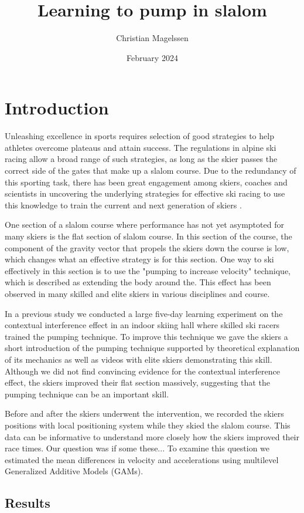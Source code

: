 \documentclass{article}
\title{Learning to pump in slalom}
\author{Christian Magelssen}
\date{February 2024}
\begin{document}
\section{Introduction}
Unleashing excellence in sports requires selection of good strategies to help athletes overcome plateaus and attain success. The regulations in alpine ski racing allow a broad range of such strategies, as long as the skier passes the correct side of the gates that make up a slalom course. Due to the redundancy of this sporting task, there has been great engagement among skiers, coaches and scientists in uncovering the underlying strategies for effective ski racing to use this knowledge to train the current and next generation of skiers \cite{joubertHowSkiNew1967, joubertSkiArtTechnique1978, mullerAnalysisBiomechanicalCharacteristics1994, lemasterSkierEdge1999, lemasterUltimateSkiing2010}.

One section of a slalom course where performance has not yet asymptoted for many skiers is the flat section of slalom course. In this section of the course, the component of the gravity vector that propels the skiers down the course is low, which changes what an effective strategy is for this section. One way to ski effectively in this section is to use the "pumping to increase velocity" technique, which is described as extending the body around the. This effect has been observed in many skilled and elite skiers in various disciplines and course.

In a previous study we conducted a large five-day learning experiment on the contextual interference effect in an indoor skiing hall where skilled ski racers trained the pumping technique. To improve this technique we gave the skiers a short introduction of the pumping technique supported by theoretical explanation of its mechanics as well as videos with elite skiers demonstrating this skill. Although we did not find convincing evidence for the contextual interference effect, the skiers improved their flat section massively, suggesting that the pumping technique can be an important skill.

Before and after the skiers underwent the intervention, we recorded the skiers positions with local positioning system while they skied the slalom course. This data can be informative to understand more closely how the skiers improved their race times. Our question was if some these... To examine this question we estimated the mean differences in velocity and accelerations using multilevel Generalized Additive Models (GAMs).

\subsection{Results}
\end{document}

